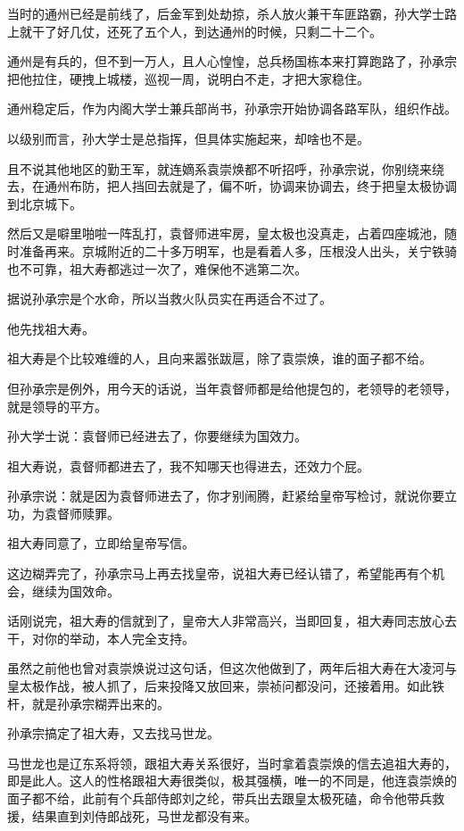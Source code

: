\begin{multicols}{\theparacolNo}
当时的通州已经是前线了，后金军到处劫掠，杀人放火兼干车匪路霸，孙大学士路上就干了好几仗，还死了五个人，到达通州的时候，只剩二十二个。

通州是有兵的，但不到一万人，且人心惶惶，总兵杨国栋本来打算跑路了，孙承宗把他拉住，硬拽上城楼，巡视一周，说明白不走，才把大家稳住。

通州稳定后，作为内阁大学士兼兵部尚书，孙承宗开始协调各路军队，组织作战。

以级别而言，孙大学士是总指挥，但具体实施起来，却啥也不是。

且不说其他地区的勤王军，就连嫡系袁崇焕都不听招呼，孙承宗说，你别绕来绕去，在通州布防，把人挡回去就是了，偏不听，协调来协调去，终于把皇太极协调到北京城下。

然后又是噼里啪啦一阵乱打，袁督师进牢房，皇太极也没真走，占着四座城池，随时准备再来。京城附近的二十多万明军，也是看着人多，压根没人出头，关宁铁骑也不可靠，祖大寿都逃过一次了，难保他不逃第二次。

据说孙承宗是个水命，所以当救火队员实在再适合不过了。

他先找祖大寿。

祖大寿是个比较难缠的人，且向来嚣张跋扈，除了袁崇焕，谁的面子都不给。

但孙承宗是例外，用今天的话说，当年袁督师都是给他提包的，老领导的老领导，就是领导的平方。

孙大学士说：袁督师已经进去了，你要继续为国效力。

祖大寿说，袁督师都进去了，我不知哪天也得进去，还效力个屁。

孙承宗说：就是因为袁督师进去了，你才别闹腾，赶紧给皇帝写检讨，就说你要立功，为袁督师赎罪。

祖大寿同意了，立即给皇帝写信。

这边糊弄完了，孙承宗马上再去找皇帝，说祖大寿已经认错了，希望能再有个机会，继续为国效命。

话刚说完，祖大寿的信就到了，皇帝大人非常高兴，当即回复，祖大寿同志放心去干，对你的举动，本人完全支持。

虽然之前他也曾对袁崇焕说过这句话，但这次他做到了，两年后祖大寿在大凌河与皇太极作战，被人抓了，后来投降又放回来，崇祯问都没问，还接着用。如此铁杆，就是孙承宗糊弄出来的。

孙承宗搞定了祖大寿，又去找马世龙。

马世龙也是辽东系将领，跟祖大寿关系很好，当时拿着袁崇焕的信去追祖大寿的，即是此人。这人的性格跟祖大寿很类似，极其强横，唯一的不同是，他连袁崇焕的面子都不给，此前有个兵部侍郎刘之纶，带兵出去跟皇太极死磕，命令他带兵救援，结果直到刘侍郎战死，马世龙都没有来。


\end{multicols}

